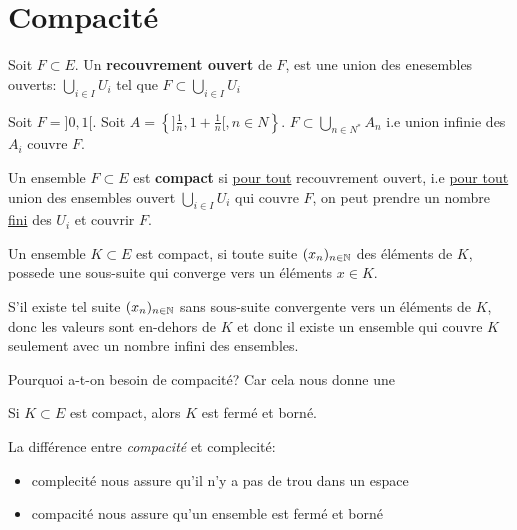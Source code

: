 \section{Compacité}
\begin{definition}
    Soit $F \subset E$. Un \textbf{recouvrement ouvert} de $F$, est une union des enesembles ouverts:  $\bigcup_{i \in I} U_i$ tel que $F \subset \bigcup_{i \in I} U_i$
\end{definition}
\begin{eg}
    Soit $F = ]0, 1[$. Soit $A = \left\{]\frac{1}{n}, 1 + \frac{1}{n}[, n \in N\right\}$. $F \subset \bigcup_{n \in N^{*}} A_n$ i.e union infinie des $A_i$ couvre $F$.
\end{eg}
\begin{definition}
    Un ensemble $F \subset E$ est \textbf{compact} si \underline{pour tout} recouvrement ouvert, i.e \underline{pour tout} union des ensembles ouvert $\bigcup_{i \in I} U_i$ qui couvre $F$, on peut prendre un nombre \underline{fini} des  $U_i$ et couvrir $F$.
\end{definition}
\begin{theorem}
    Un ensemble $K \subset E$ est compact, si toute suite $(x_n)_{n \in \mathbb{N}}$ des éléments de $K$, possede une sous-suite qui converge  vers un éléments $x \in K$.
\end{theorem}
\begin{intuition}
    S'il existe tel suite $(x_n)_{n \in \mathbb{N}}$ sans sous-suite convergente vers un éléments de  $K$, donc les valeurs sont en-dehors de  $K$ et donc il existe un ensemble qui couvre $K$  seulement avec un nombre infini des ensembles. 
\end{intuition}
Pourquoi a-t-on besoin de compacité? Car cela nous donne une
\begin{prop}
    Si $K \subset E$ est compact, alors $K$ est fermé et borné.
\end{prop}
\begin{property}
    La différence entre \textit{compacité} et {complecité}:
    \begin{itemize}
        \item complecité nous assure qu'il n'y a pas de trou dans un espace
        \item compacité nous assure qu'un ensemble est fermé et borné
    \end{itemize}
\end{property}

